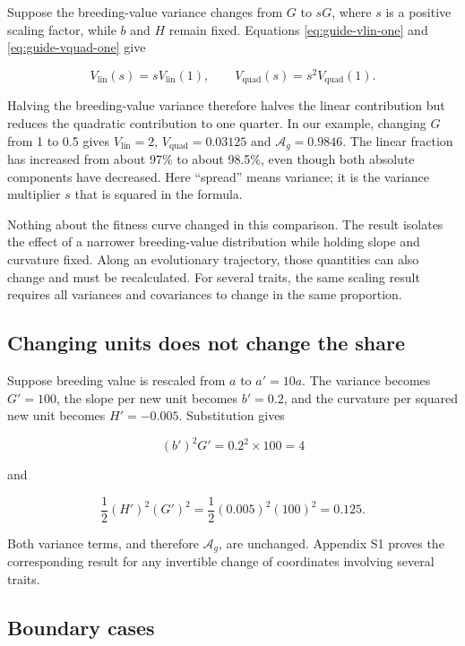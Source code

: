 \documentclass[11pt]{article}
\newcommand{\Ag}{\ensuremath{\mathcal A_g}}
\newcommand{\Vlin}{\ensuremath{V_{\mathrm{lin}}}}
\newcommand{\Vquad}{\ensuremath{V_{\mathrm{quad}}}}
\begin{document}
Suppose the breeding-value variance changes from $G$ to $sG$, where $s$ is a
positive scaling factor, while $b$ and $H$ remain fixed.  Equations
\eqref{eq:guide-vlin-one} and \eqref{eq:guide-vquad-one} give

\begin{equation}
\Vlin(s)=s\Vlin(1),
\qquad
\Vquad(s)=s^2\Vquad(1).
\label{eq:guide-scaling}
\end{equation}

Halving the breeding-value variance therefore halves the linear contribution but reduces the quadratic contribution to one quarter. In our example, changing $G$ from 1 to 0.5 gives $\Vlin=2$, $\Vquad=0.03125$ and $\Ag=0.9846$. The linear fraction has increased from about 97\% to about 98.5\%, even though both absolute components have decreased. Here ``spread'' means variance; it is the variance multiplier $s$ that is squared in the formula.

Nothing about the fitness curve changed in this comparison. The result isolates the effect of a narrower breeding-value distribution while holding slope and curvature fixed. Along an evolutionary trajectory, those quantities can also change and must be recalculated. For several traits, the same scaling result requires all variances and covariances to change in the same proportion.

\subsection{Changing units does not change the share}

Suppose breeding value is rescaled from $a$ to $a'=10a$.  The variance becomes
$G'=100$, the slope per new unit becomes $b'=0.2$, and the curvature per
squared new unit becomes $H'=-0.005$.  Substitution gives

\begin{equation}
(b')^2G'=0.2^2\times100=4
\end{equation}

and

\begin{equation}
\frac12(H')^2(G')^2
=\frac12(0.005)^2(100)^2=0.125.
\end{equation}

Both variance terms, and therefore \Ag, are unchanged.  Appendix S1 proves
the corresponding result for any invertible change of coordinates involving
several traits.

\subsection{Boundary cases}
\end{document}
